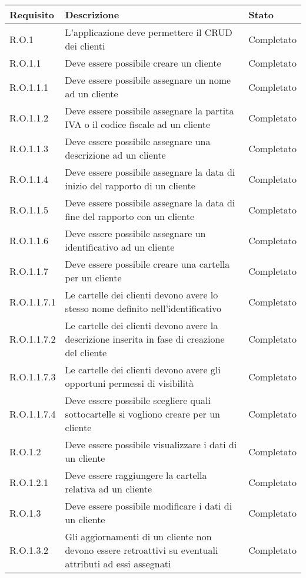 \begin{longtable}{p{} p{} p{}}
\hline\hline
\textbf{Requisito} & \textbf{Descrizione} & \textbf{Stato}\\
\hline
\hline
R.O.1    & L'applicazione deve permettere il CRUD dei clienti & Completato \\
\hline
R.O.1.1  & Deve essere possibile creare un cliente & Completato \\
\hline
R.O.1.1.1  & Deve essere possibile assegnare un nome ad un cliente & Completato \\
\hline
R.O.1.1.2  & Deve essere possibile assegnare la partita IVA o il codice fiscale ad un cliente & Completato \\
\hline
R.O.1.1.3  & Deve essere possibile assegnare una descrizione ad un cliente & Completato \\
\hline
R.O.1.1.4  & Deve essere possibile assegnare la data di inizio del rapporto di un cliente & Completato \\
\hline
R.O.1.1.5  & Deve essere possibile assegnare la data di fine del rapporto con un cliente & Completato \\
\hline
R.O.1.1.6  & Deve essere possibile assegnare un identificativo ad un cliente & Completato \\
\hline
R.O.1.1.7  & Deve essere possibile creare una cartella per un cliente & Completato \\
\hline
R.O.1.1.7.1  & Le cartelle dei clienti devono avere lo stesso nome definito nell'identificativo & Completato \\
\hline
R.O.1.1.7.2  & Le cartelle dei clienti devono avere la descrizione inserita in fase di creazione del cliente & Completato \\
\hline
R.O.1.1.7.3  & Le cartelle dei clienti devono avere gli opportuni permessi di visibilità & Completato \\
\hline
R.O.1.1.7.4  & Deve essere possibile scegliere quali sottocartelle si vogliono creare per un cliente & Completato \\
\hline
R.O.1.2  & Deve essere possibile visualizzare i dati di un cliente & Completato \\
\hline
R.O.1.2.1  & Deve essere raggiungere la cartella relativa ad un cliente & Completato \\
\hline
R.O.1.3  & Deve essere possibile modificare i dati di un cliente & Completato \\
\hline
R.O.1.3.2  & Gli aggiornamenti di un cliente non devono essere retroattivi su eventuali attributi ad essi assegnati & Completato \\

\end{longtable}
